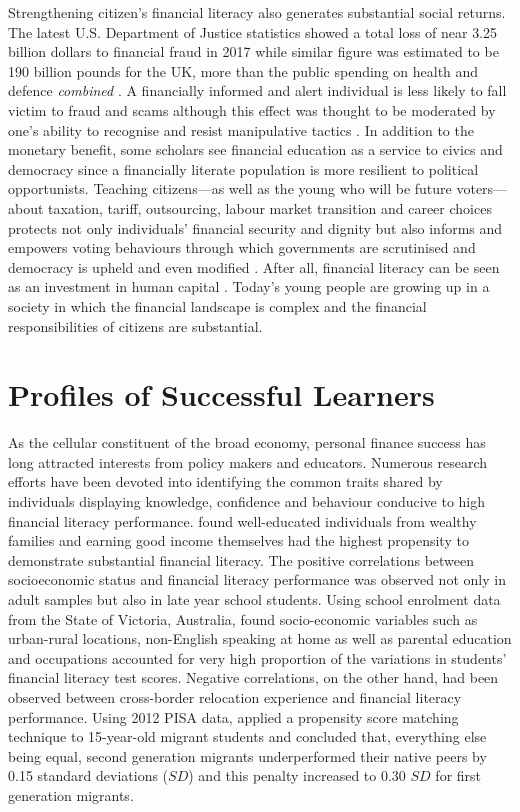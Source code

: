 \documentclass[a4paper,11pt,UKenglish,twoside,openright]{report}\usepackage[]{graphicx}\usepackage[]{color}
\begin{document}
Strengthening citizen's financial literacy also generates substantial social returns. The latest U.S. Department of Justice statistics showed a total loss of near 3.25 billion dollars to financial fraud in 2017 \parencite{doj:2021} while similar figure was estimated to be 190 billion pounds for the UK, more than the public spending on health and defence \emph{combined} \parencite{afi:2018}. A financially informed and alert individual is less likely to fall victim to fraud and scams \parencite{gamble:2015, lusardi:2012b} although this effect was thought to be moderated by one's ability to recognise and resist manipulative tactics \parencite{drew:2016}. In addition to the monetary benefit, some scholars see financial education as a service to civics and democracy since a financially literate population is more resilient to political opportunists. Teaching citizens---as well as the young who will be future voters---about taxation, tariff, outsourcing, labour market transition and career choices protects not only individuals' financial security and dignity but also informs and empowers voting behaviours through which governments are scrutinised and democracy is upheld \parencite{davies:2015} and even modified \parencite{arthur:2016}. After all, financial literacy can be seen as an investment in human capital \parencite{lusardi:2014}. Today's young people are growing up in a society in which the financial landscape is complex and the financial responsibilities of citizens are substantial.

\section{Profiles of Successful Learners}\label{sec:control}

As the cellular constituent of the broad economy, personal finance success has long attracted interests from policy makers and educators. Numerous research efforts have been devoted into identifying the common traits shared by individuals displaying knowledge, confidence and behaviour conducive to high financial literacy performance. \textcite{potrich:2015a} found well-educated individuals from wealthy families and earning good income themselves had the highest propensity to demonstrate substantial financial literacy. The positive correlations between socioeconomic status and financial literacy performance was observed not only in adult samples but also in late year school students. Using  school enrolment data from the State of Victoria, Australia, \textcite{ali:2016} found socio-economic variables such as urban-rural locations, non-English speaking at home as well as parental education and occupations accounted for very high proportion of the variations in students' financial literacy test scores. Negative correlations, on the other hand, had been observed between cross-border relocation experience and financial literacy performance. Using 2012 PISA data, \textcite{gramatki:2017} applied a propensity score matching technique to 15-year-old migrant students and concluded that, everything else being equal, second generation migrants underperformed their native peers by 0.15 standard deviations ($SD$) and this penalty increased to 0.30 $SD$ for first generation migrants.
\end{document}
